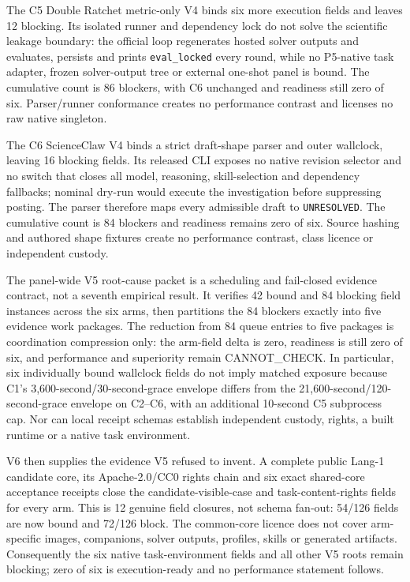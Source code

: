 The C5 Double Ratchet metric-only V4 binds six more execution fields and leaves
12 blocking. Its isolated runner and dependency lock do not solve the
scientific leakage boundary: the official loop regenerates hosted solver
outputs and evaluates, persists and prints \texttt{eval\_locked} every round,
while no P5-native task adapter, frozen solver-output tree or external one-shot
panel is bound. The cumulative count is 86 blockers, with C6 unchanged and
readiness still zero of six. Parser/runner conformance creates no performance
contrast and licenses no raw native singleton.

The C6 ScienceClaw V4 binds a strict draft-shape parser and outer wallclock,
leaving 16 blocking fields. Its released CLI exposes no native revision selector
and no switch that closes all model, reasoning, skill-selection and dependency
fallbacks; nominal dry-run would execute the investigation before suppressing
posting. The parser therefore maps every admissible draft to
\texttt{UNRESOLVED}. The cumulative count is 84 blockers and readiness remains
zero of six. Source hashing and authored shape fixtures create no performance
contrast, class licence or independent custody.

The panel-wide V5 root-cause packet is a scheduling and fail-closed evidence
contract, not a seventh empirical result. It verifies 42 bound and 84 blocking
field instances across the six arms, then partitions the 84 blockers exactly
into five evidence work packages. The reduction from 84 queue entries to five
packages is coordination compression only: the arm-field delta is zero,
readiness is still zero of six, and performance and superiority remain
\textsf{CANNOT\_CHECK}. In particular, six individually bound wallclock fields
do not imply matched exposure because C1's 3,600-second/30-second-grace
envelope differs from the 21,600-second/120-second-grace envelope on C2--C6,
with an additional 10-second C5 subprocess cap. Nor can local receipt schemas
establish independent custody, rights, a built runtime or a native task
environment.

V6 then supplies the evidence V5 refused to invent. A complete public Lang-1
candidate core, its Apache-2.0/CC0 rights chain and six exact shared-core
acceptance receipts close the candidate-visible-case and task-content-rights
fields for every arm. This is 12 genuine field closures, not schema fan-out:
54/126 fields are now bound and 72/126 block. The common-core licence does not
cover arm-specific images, companions, solver outputs, profiles, skills or
generated artifacts. Consequently the six native task-environment fields and
all other V5 roots remain blocking; zero of six is execution-ready and no
performance statement follows.

